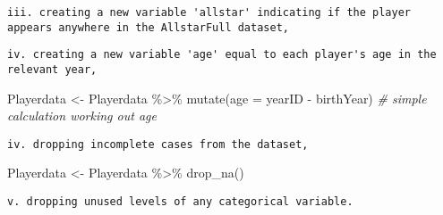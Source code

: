 \documentclass[
]{article}
\newenvironment{Shaded}{\begin{snugshade}}{\end{snugshade}}
\newcommand{\AttributeTok}[1]{\textcolor[rgb]{0.77,0.63,0.00}{#1}}
\newcommand{\CommentTok}[1]{\textcolor[rgb]{0.56,0.35,0.01}{\textit{#1}}}
\newcommand{\FunctionTok}[1]{\textcolor[rgb]{0.00,0.00,0.00}{#1}}
\newcommand{\NormalTok}[1]{#1}
\newcommand{\OtherTok}[1]{\textcolor[rgb]{0.56,0.35,0.01}{#1}}
\newcommand{\SpecialCharTok}[1]{\textcolor[rgb]{0.00,0.00,0.00}{#1}}
\begin{document}
\begin{verbatim}
iii. creating a new variable 'allstar' indicating if the player appears anywhere in the AllstarFull dataset,
\end{verbatim}

\begin{Shaded}
\end{Shaded}

\begin{verbatim}
iv. creating a new variable 'age' equal to each player's age in the relevant year,
\end{verbatim}

\begin{Shaded}
\begin{Highlighting}[]
\NormalTok{Playerdata }\OtherTok{\textless{}{-}}\NormalTok{ Playerdata }\SpecialCharTok{\%\textgreater{}\%}
  \FunctionTok{mutate}\NormalTok{(}\AttributeTok{age =}\NormalTok{ yearID }\SpecialCharTok{{-}}\NormalTok{ birthYear) }\CommentTok{\# simple calculation working out age}
\end{Highlighting}
\end{Shaded}

\begin{verbatim}
iv. dropping incomplete cases from the dataset,
\end{verbatim}

\begin{Shaded}
\begin{Highlighting}[]
\NormalTok{Playerdata }\OtherTok{\textless{}{-}}\NormalTok{ Playerdata }\SpecialCharTok{\%\textgreater{}\%}
  \FunctionTok{drop\_na}\NormalTok{()}
\end{Highlighting}
\end{Shaded}

\begin{verbatim}
v. dropping unused levels of any categorical variable.
\end{verbatim}
\end{document}
